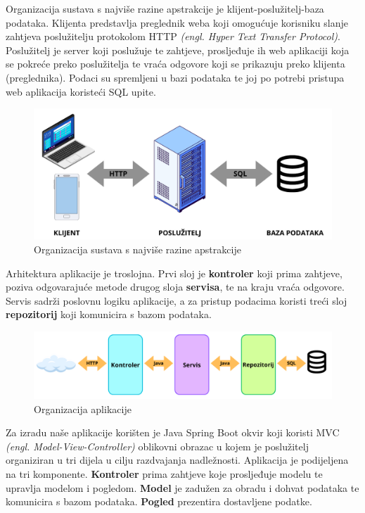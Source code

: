 	Organizacija sustava s najviše razine apstrakcije je klijent-poslužitelj-baza podataka. Klijenta predstavlja preglednik weba koji omogućuje korisniku slanje zahtjeva poslužitelju protokolom HTTP \textit{(engl. Hyper Text Transfer Protocol)}. Poslužitelj je server koji poslužuje te zahtjeve, prosljeđuje ih web aplikaciji koja se pokreće preko poslužitelja te vraća odgovore koji se prikazuju preko klijenta (preglednika). Podaci su spremljeni u bazi podataka te joj po potrebi pristupa web aplikacija koristeći SQL upite.
					\begin{figure}[H]
						\includegraphics[scale=0.4]{slike/arh1.PNG} %
						\centering
						\caption{Organizacija sustava s najviše razine apstrakcije}
						\label{fig:promjene4}
					\end{figure}	
	Arhitektura aplikacije je troslojna. Prvi sloj je \textbf {kontroler} koji prima zahtjeve, poziva odgovarajuće metode drugog sloja \textbf {servisa}, te na kraju vraća odgovore. Servis sadrži poslovnu logiku aplikacije, a za pristup podacima koristi treći sloj \textbf {repozitorij} koji komunicira s bazom podataka.
					\begin{figure}[H]
						\includegraphics[scale=0.3]{slike/arh2.PNG} %
						\centering
						\caption{Organizacija aplikacije}
						\label{fig:promjene5}
					\end{figure}	
	Za izradu naše aplikacije korišten je Java Spring Boot okvir koji koristi MVC \textit{(engl. Model-View-Controller)} oblikovni obrazac u kojem je poslužitelj organiziran u tri dijela u cilju razdvajanja nadležnosti. Aplikacija je podijeljena na tri komponente. \textbf {Kontroler} prima zahtjeve koje prosljeđuje modelu te upravlja modelom i pogledom. \textbf {Model} je zadužen za obradu i dohvat podataka te komunicira s bazom podataka. \textbf {Pogled} prezentira dostavljene podatke.
	
